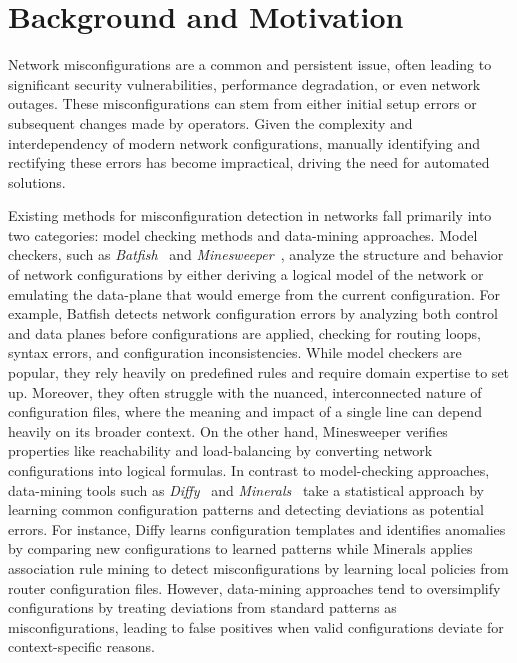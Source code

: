 \section{Background and Motivation}
\label{sec_background}
Network misconfigurations are a common and persistent issue, often leading to significant security vulnerabilities, performance degradation, or even network outages. These misconfigurations can stem from either initial setup errors or subsequent changes made by operators. Given the complexity and interdependency of modern network configurations, manually identifying and rectifying these errors has become impractical, driving the need for automated solutions.

Existing methods for misconfiguration detection in networks fall primarily into two categories: model checking methods and data-mining approaches. Model checkers, such as \textit{Batfish}~\cite{fogel2015general} and \textit{Minesweeper}~\cite{beckett2017general}, analyze the structure and behavior of network configurations by either deriving a logical model of the network or emulating the data-plane that would emerge from the current configuration.
For example, Batfish detects network configuration errors by analyzing both control and data planes before configurations are applied, checking for routing loops, syntax errors, and configuration inconsistencies. While model checkers are popular, they rely heavily on predefined rules and require domain expertise to set up. Moreover, they often struggle with the nuanced, interconnected nature of configuration files, where the meaning and impact of a single line can depend heavily on its broader context.
On the other hand, Minesweeper verifies properties like reachability and load-balancing by converting network configurations into logical formulas.
In contrast to model-checking approaches, data-mining tools such as \textit{Diffy}~\cite{kakarla2024diffy} and \textit{Minerals}~\cite{le2006minerals} take a statistical approach by learning common configuration patterns and detecting deviations as potential errors.
For instance, Diffy learns configuration templates and identifies anomalies by comparing new configurations to learned patterns while Minerals applies association rule mining to detect misconfigurations by learning local policies from router configuration files. However, data-mining approaches tend to oversimplify configurations by treating deviations from standard patterns as misconfigurations, leading to false positives when valid configurations deviate for context-specific reasons.


